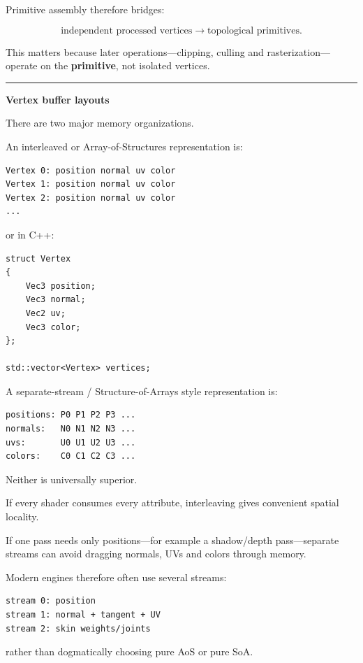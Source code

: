 Primitive assembly therefore bridges:

\[
\text{independent processed vertices}
\rightarrow
\text{topological primitives}.
\]

This matters because later operations---clipping, culling and rasterization---operate on the \textbf{primitive}, not isolated vertices.

\begin{center}\rule{0.5\linewidth}{0.5pt}\end{center}

\textbf{Vertex buffer layouts}

There are two major memory organizations.

An interleaved or Array-of-Structures representation is:

\begin{verbatim}
Vertex 0: position normal uv color
Vertex 1: position normal uv color
Vertex 2: position normal uv color
...
\end{verbatim}

or in C++:

\begin{verbatim}
struct Vertex
{
    Vec3 position;
    Vec3 normal;
    Vec2 uv;
    Vec3 color;
};

std::vector<Vertex> vertices;
\end{verbatim}

A separate-stream / Structure-of-Arrays style representation is:

\begin{verbatim}
positions: P0 P1 P2 P3 ...
normals:   N0 N1 N2 N3 ...
uvs:       U0 U1 U2 U3 ...
colors:    C0 C1 C2 C3 ...
\end{verbatim}

Neither is universally superior.

If every shader consumes every attribute, interleaving gives convenient spatial locality.

If one pass needs only positions---for example a shadow/depth pass---separate streams can avoid dragging normals, UVs and colors through memory.

Modern engines therefore often use several streams:

\begin{verbatim}
stream 0: position
stream 1: normal + tangent + UV
stream 2: skin weights/joints
\end{verbatim}

rather than dogmatically choosing pure AoS or pure SoA.

